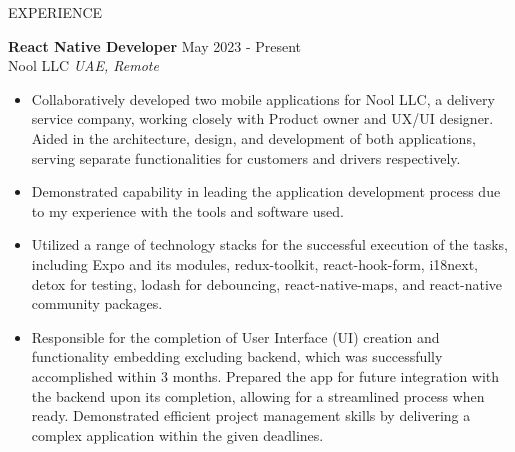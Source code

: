 \documentclass{resume} %
\begin{document}
\begin{rSection}{EXPERIENCE}

\textbf{React Native Developer} \hfill May 2023 - Present\\
Nool LLC \hfill \textit{UAE, Remote}
 \begin{itemize}
    \itemsep -3pt {} 
        \item Collaboratively developed two mobile applications for Nool LLC, a delivery service company, working closely with Product owner and UX/UI designer. Aided in the architecture, design, and development of both applications, serving separate functionalities for customers and drivers respectively.
        \item Demonstrated capability in leading the application development process due to my experience with the tools and software used.
        \item Utilized a range of technology stacks for the successful execution of the tasks, including Expo and its modules, redux-toolkit, react-hook-form, i18next, detox for testing, lodash for debouncing, react-native-maps, and react-native community packages.
        \item Responsible for the completion of User Interface (UI) creation and functionality embedding excluding backend, which was successfully accomplished within 3 months. Prepared the app for future integration with the backend upon its completion, allowing for a streamlined process when ready. Demonstrated efficient project management skills by delivering a complex application within the given deadlines.
 \end{itemize}


\end{rSection}
\end{document}
